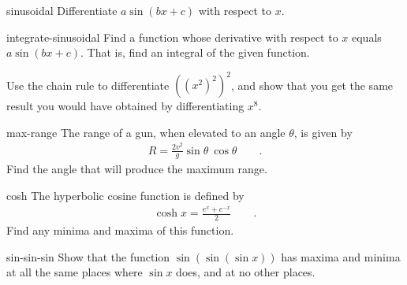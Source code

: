 \begin{hwsection}
\begin{hwwithsoln}{sinusoidal}
Differentiate $a\sin(bx+c)$ with respect to $x$.
\end{hwwithsoln}

\begin{hwwithsoln}{integrate-sinusoidal}
Find a function whose derivative with respect to $x$ equals $a\sin(bx+c)$. That is, find an
integral of the given function.
\end{hwwithsoln}

\begin{hw}
Use the chain rule to differentiate $((x^2)^2)^2$, and show that you get the
same result you would have obtained by differentiating $x^8$.
\end{hw}


\begin{hwwithsoln}{max-range}
The range of a gun, when elevated to an angle $\theta$, is given by
\begin{align*}
  R=\frac{2v^2}{g}\sin\theta\:\cos\theta \qquad .
\end{align*}
Find the angle that will produce the maximum range.
\end{hwwithsoln}

\begin{hwwithsoln}{cosh}
The hyperbolic cosine function is defined by
\begin{align*}
  \cosh x = \frac{e^x+e^{-x}}{2} \qquad .
\end{align*}
Find any minima and maxima of this function.
\end{hwwithsoln}

\begin{hwwithsoln}{sin-sin-sin}
Show that the function $\sin(\sin(\sin x))$ has maxima and minima at all the same places
where $\sin x$ does, and at no other places.
\end{hwwithsoln}

\pagebreak


\end{hwsection}
